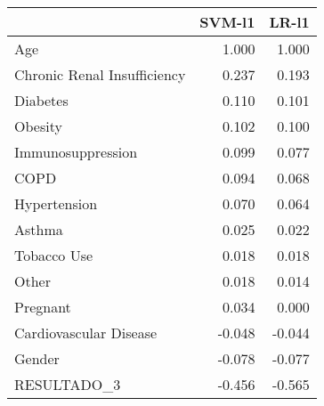 \begin{tabular}{lrr}
\toprule
{} &  SVM-l1 &  LR-l1 \\
\midrule
Age                         &   1.000 &  1.000 \\
Chronic Renal Insufficiency &   0.237 &  0.193 \\
Diabetes                    &   0.110 &  0.101 \\
Obesity                     &   0.102 &  0.100 \\
Immunosuppression           &   0.099 &  0.077 \\
COPD                        &   0.094 &  0.068 \\
Hypertension                &   0.070 &  0.064 \\
Asthma                      &   0.025 &  0.022 \\
Tobacco Use                 &   0.018 &  0.018 \\
Other                       &   0.018 &  0.014 \\
Pregnant                    &   0.034 &  0.000 \\
Cardiovascular Disease      &  -0.048 & -0.044 \\
Gender                      &  -0.078 & -0.077 \\
RESULTADO\_3                 &  -0.456 & -0.565 \\
\bottomrule
\end{tabular}
